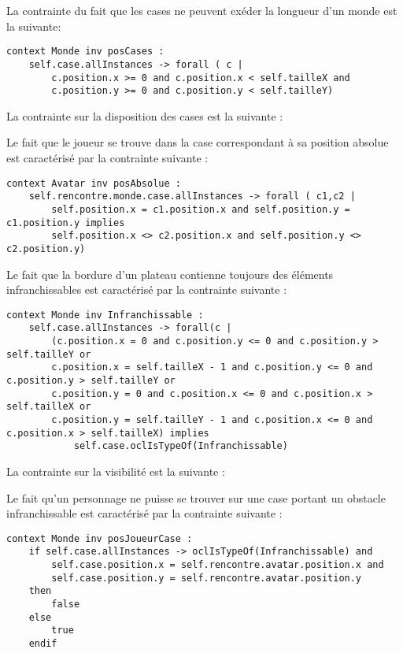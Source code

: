 La contrainte du fait que les cases ne peuvent exéder la longueur d'un monde est la suivante:

\begin{lstlisting}[caption=Contrainte sur la position des cases,captionpos=b,label={lst:casePos},language=OCL]
context Monde inv posCases :
	self.case.allInstances -> forall ( c |
		c.position.x >= 0 and c.position.x < self.tailleX and
		c.position.y >= 0 and c.position.y < self.tailleY)
\end{lstlisting}

La contrainte  sur la disposition des cases est la suivante :


Le fait que le joueur se trouve dans la case correspondant à sa position absolue est caractérisé par la contrainte suivante :

\begin{lstlisting}[caption=Contrainte sur la position du joueur,captionpos=b,label={lst:posJoueur},language=OCL]
context Avatar inv posAbsolue :
	self.rencontre.monde.case.allInstances -> forall ( c1,c2 |
		self.position.x = c1.position.x and self.position.y = c1.position.y implies
		self.position.x <> c2.position.x and self.position.y <> c2.position.y)
\end{lstlisting}

Le fait que la bordure d'un plateau contienne toujours des éléments infranchissables est caractérisé par la contrainte suivante :

\begin{lstlisting}[caption=Contrainte sur la bordure du plateau,captionpos=b,label={lst:bordurePlat},language=OCL]
context Monde inv Infranchissable :
	self.case.allInstances -> forall(c |
		(c.position.x = 0 and c.position.y <= 0 and c.position.y > self.tailleY or
		c.position.x = self.tailleX - 1 and c.position.y <= 0 and c.position.y > self.tailleY or
		c.position.y = 0 and c.position.x <= 0 and c.position.x > self.tailleX or
		c.position.y = self.tailleY - 1 and c.position.x <= 0 and c.position.x > self.tailleX) implies
			self.case.oclIsTypeOf(Infranchissable)
\end{lstlisting}

La contrainte sur la visibilité est la suivante :

Le fait qu'un personnage ne puisse se trouver sur une case portant un obstacle infranchissable est caractérisé par la contrainte suivante :

\begin{lstlisting}[caption=Contrainte sur la position du joueur sur case infranchissable,captionpos=b,label={lst:caseInfranchissable},language=OCL]
context Monde inv posJoueurCase :
	if self.case.allInstances -> oclIsTypeOf(Infranchissable) and
		self.case.position.x = self.rencontre.avatar.position.x and
		self.case.position.y = self.rencontre.avatar.position.y
	then
		false
	else
		true
	endif
\end{lstlisting}

